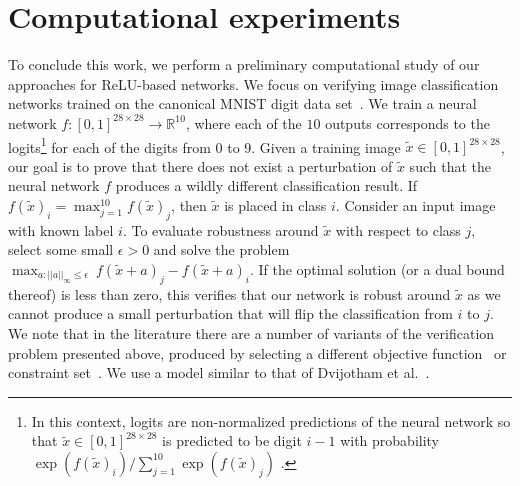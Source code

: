 \documentclass[smallextended]{svjour3}
\newcommand{\blue}[1]{{#1}}
\newcommand{\bbR}{\mathbb{R}}
\newcommand\defeq{\mathrel{\overset{\makebox[0pt]{\mbox{\normalfont\tiny\sffamily def}}}{=}}}
\begin{document}

\section{Computational experiments} \label{sec:computational}
To conclude this work, we perform a preliminary computational study of our approaches for ReLU-based networks. We focus on verifying image classification networks trained on the canonical MNIST digit data set~\cite{LeCun:1998}. We train a neural network $f : [0,1]^{28 \times 28} \to \bbR^{10}$, where each of the $10$ outputs corresponds to the logits\footnote{\blue{In this context, logits are non-normalized predictions of the neural network so that $\tilde{x} \in [0,1]^{28 \times 28}$ is predicted to be digit $i-1$ with probability $\exp(f(\tilde{x})_i)/\sum_{j=1}^{10}\exp(f(\tilde{x})_j)$    \cite{logits-def}.}} for each of the digits from 0 to 9. Given a training image $\tilde{x} \in [0,1]^{28 \times 28}$, our goal is to prove that there does not exist a perturbation of $\tilde{x}$ such that the neural network $f$ produces a wildly different classification result. If $f(\tilde{x})_i = \max_{j=1}^{10} f(\tilde{x})_j$, then $\tilde{x}$ is placed in class $i$. Consider an input image with known label $i$. To evaluate robustness around $\tilde{x}$ with respect to class $j$, select some small $\epsilon > 0$ and solve the problem $\max_{a : ||a||_\infty \leq \epsilon}\: f(\tilde{x} + a)_j - f(\tilde{x} + a)_i$. If the optimal solution (or a dual bound thereof) is less than zero, this verifies that our network is robust around $\tilde{x}$ as we cannot produce a small perturbation that will flip the classification from $i$ to $j$. 
\blue{We note that in the literature there are a number of variants of the verification problem presented above, produced by  selecting a different objective function~\cite{Liu:2019,Xiao:2018} or constraint set~\cite{Engstrom:2019}. We use a model similar to that of Dvijotham et al.~\cite{Dvijotham:2018,Dvijotham:2018a}.}
\end{document}

